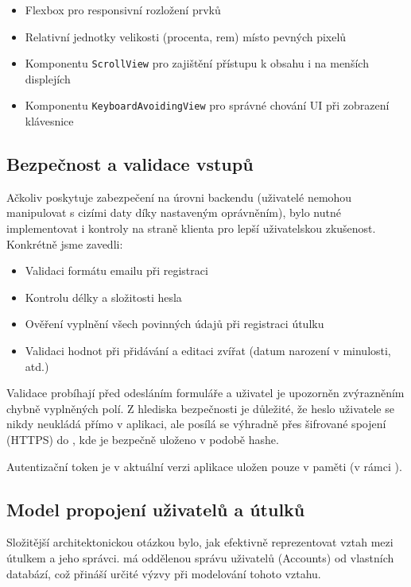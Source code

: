 \documentclass[czech, bp, kiv, he, iso690numb, pdf]{fasthesis}
\begin{document}
    \begin{itemize}
        \item Flexbox pro responsivní rozložení prvků
        \item Relativní jednotky velikosti (procenta, rem) místo pevných pixelů
        \item Komponentu \texttt{ScrollView} pro zajištění přístupu k obsahu i na menších displejích
        \item Komponentu \texttt{KeyboardAvoidingView} pro správné chování UI při zobrazení klávesnice
    \end{itemize}


    \subsection*{Bezpečnost a validace vstupů}

    Ačkoliv  poskytuje zabezpečení na úrovni backendu (uživatelé nemohou manipulovat s cizími daty díky nastaveným oprávněním), bylo nutné implementovat i kontroly na straně klienta pro lepší uživatelskou zkušenost. Konkrétně jsme zavedli:

    \begin{itemize}
        \item Validaci formátu emailu při registraci
        \item Kontrolu délky a složitosti hesla
        \item Ověření vyplnění všech povinných údajů při registraci útulku
        \item Validaci hodnot při přidávání a editaci zvířat (datum narození v minulosti, atd.)
    \end{itemize}

    Validace probíhají před odesláním formuláře a uživatel je upozorněn zvýrazněním chybně vyplněných polí. Z hlediska bezpečnosti je důležité, že heslo uživatele se nikdy neukládá přímo v aplikaci, ale posílá se výhradně přes šifrované spojení (HTTPS) do , kde je bezpečně uloženo v podobě hashe.

    Autentizační token je v aktuální verzi aplikace uložen pouze v paměti (v rámci ).

    \subsection*{Model propojení uživatelů a útulků}

    Složitější architektonickou otázkou bylo, jak efektivně reprezentovat vztah mezi útulkem a jeho správci.  má oddělenou správu uživatelů (Accounts) od vlastních databází, což přináší určité výzvy při modelování tohoto vztahu.
\end{document}
